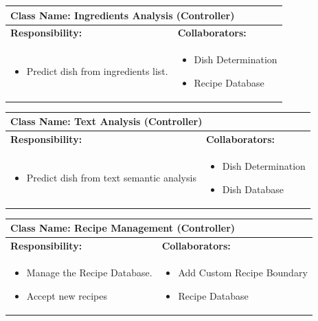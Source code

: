 \documentclass[]{article}
\begin{document}
\begin{table}[H]
	\centering
	\begin{tabular}{|p{7cm}|p{7cm}|}
	\hline 
	 \multicolumn{2}{|l|}{\textbf{Class Name: Ingredients Analysis (Controller)}} \\
	\hline
	\textbf{Responsibility:} & \textbf{Collaborators:} \\
	\hline
	\raggedright
	\begin{itemize}
		\item Predict dish from ingredients list.
	\end{itemize}
	\vspace{1in} & 
	\begin{itemize}
		\item Dish Determination
		\item Recipe Database
	\end{itemize} \\
	\hline
	\end{tabular}
\end{table}

\begin{table}[H]
	\centering
	\begin{tabular}{|p{7cm}|p{7cm}|}
	\hline 
	 \multicolumn{2}{|l|}{\textbf{Class Name: Text Analysis (Controller)}} \\
	\hline
	\textbf{Responsibility:} & \textbf{Collaborators:} \\
	\hline
	\raggedright
	\begin{itemize}
		\item Predict dish from text semantic analysis
	\end{itemize}
	\vspace{1in} & 
	\begin{itemize}
		\item Dish Determination
		\item Dish Database
	\end{itemize} \\
	\hline
	\end{tabular}
\end{table}

\begin{table}[H]
	\centering
	\begin{tabular}{|p{7cm}|p{7cm}|}
	\hline 
	 \multicolumn{2}{|l|}{\textbf{Class Name: Recipe Management (Controller)}} \\
	\hline
	\textbf{Responsibility:} & \textbf{Collaborators:} \\
	\hline
	\raggedright
	\begin{itemize}
		\item Manage the Recipe Database.
		\item Accept new recipes
	\end{itemize}
	\vspace{1in} & 
	\begin{itemize}
		\item Add Custom Recipe Boundary
		\item Recipe Database
	\end{itemize} \\
	\hline
	\end{tabular}
\end{table}
\end{document}

